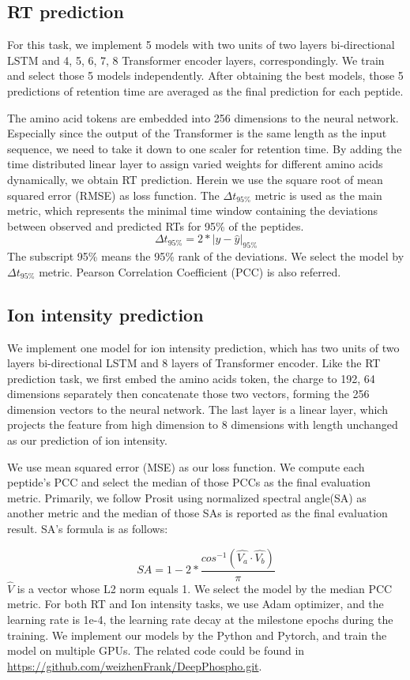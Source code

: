 \subsection{RT prediction}

For this task, we implement 
5 models with two units of two layers bi-directional LSTM and 4, 5, 6, 7, 8 Transformer encoder layers, correspondingly. We train and select those 5 models independently. After obtaining the best models, those 5 predictions of retention time are averaged as the final prediction for each peptide. 

The amino acid tokens are embedded into 256 dimensions to the neural network.
Especially since the output of the Transformer is the same length as the input sequence, we need to take it down to one scaler for retention time. By adding the time distributed linear layer to assign varied weights for different amino acids dynamically, we obtain RT prediction.
Herein we use the square root of mean squared error (RMSE) as loss function.
The $\Delta$$t_{95\%}$ metric is used as the main metric, which represents 
the minimal time window containing the deviations between observed and predicted RTs for 95\% of 
the peptides. 
\[ \Delta t_{95\%} = 2 * | y - \hat{y} |_{95\%} \]
The subscript 95\% means the 95\% rank of the deviations. 
We select the model by $\Delta$$t_{95\%}$ metric.
Pearson Correlation Coefficient (PCC) is also referred.
\subsection{Ion intensity prediction}

We implement one model for ion intensity prediction, which has two units of two layers bi-directional LSTM and 8 layers of Transformer encoder. Like the RT prediction task, we first embed the amino acids token, the charge to 192, 64 dimensions separately then concatenate those two vectors, forming the 256 dimension vectors to the neural network. The last layer is a linear layer, which projects the feature from high dimension to 8 dimensions with length unchanged as our prediction of ion intensity.

We use mean squared 
error (MSE) as our loss function.
We compute each peptide's PCC and select the median of those PCCs as the final evaluation metric.
Primarily, we follow Prosit\cite{gessulat2019prosit} using normalized 
spectral angle(SA) as another metric and the median of those SAs is reported as the final evaluation result.
SA's formula is as follows:

\[ SA = 1 - 2 * \frac{cos^{-1}(\hat{V_a}\cdot\hat{V_b})}{\pi} \]
$\hat{V}$ is a vector whose L2 norm equals 1. We select the model by the median PCC metric.
For both RT and Ion intensity tasks, we use Adam optimizer\cite{kingma2017adam}, and the learning rate is 1e-4, the learning rate decay at the milestone epochs during the training. We implement our models by the Python and Pytorch, and train the model on multiple GPUs. The related code could be found in \url{https://github.com/weizhenFrank/DeepPhospho.git}.


